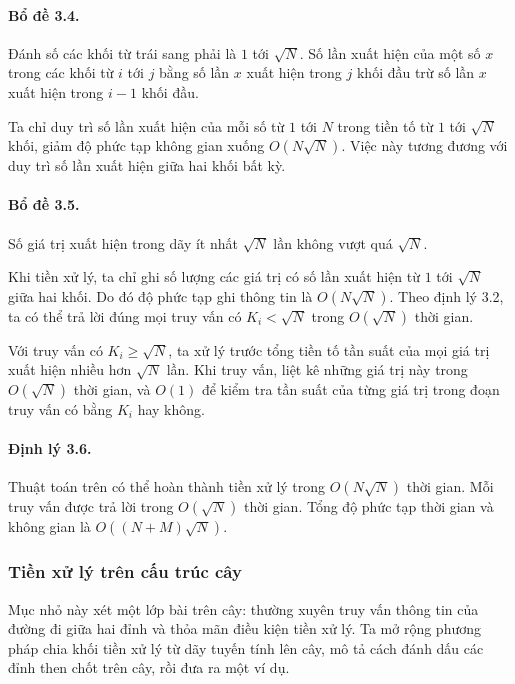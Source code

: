 \documentclass[11pt]{article}
\begin{document}
\paragraph{Bổ đề 3.4.}
Đánh số các khối từ trái sang phải là \(1\) tới \(\sqrt N\). Số lần xuất hiện
của một số \(x\) trong các khối từ \(i\) tới \(j\) bằng số lần \(x\) xuất
hiện trong \(j\) khối đầu trừ số lần \(x\) xuất hiện trong \(i-1\) khối đầu.

Ta chỉ duy trì số lần xuất hiện của mỗi số từ \(1\) tới \(N\) trong tiền tố
từ \(1\) tới \(\sqrt N\) khối, giảm độ phức tạp không gian xuống
\(O(N\sqrt N)\). Việc này tương đương với duy trì số lần xuất hiện giữa hai
khối bất kỳ.

\paragraph{Bổ đề 3.5.}
Số giá trị xuất hiện trong dãy ít nhất \(\sqrt N\) lần không vượt quá
\(\sqrt N\).

Khi tiền xử lý, ta chỉ ghi số lượng các giá trị có số lần xuất hiện từ \(1\)
tới \(\sqrt N\) giữa hai khối. Do đó độ phức tạp ghi thông tin là
\(O(N\sqrt N)\). Theo định lý 3.2, ta có thể trả lời đúng mọi truy vấn có
\(K_i<\sqrt N\) trong \(O(\sqrt N)\) thời gian.

Với truy vấn có \(K_i\ge\sqrt N\), ta xử lý trước tổng tiền tố tần suất của
mọi giá trị xuất hiện nhiều hơn \(\sqrt N\) lần. Khi truy vấn, liệt kê những
giá trị này trong \(O(\sqrt N)\) thời gian, và \(O(1)\) để kiểm tra tần suất
của từng giá trị trong đoạn truy vấn có bằng \(K_i\) hay không.

\paragraph{Định lý 3.6.}
Thuật toán trên có thể hoàn thành tiền xử lý trong \(O(N\sqrt N)\) thời gian.
Mỗi truy vấn được trả lời trong \(O(\sqrt N)\) thời gian. Tổng độ phức tạp
thời gian và không gian là \(O((N+M)\sqrt N)\).

\subsubsection{Tiền xử lý trên cấu trúc cây}

Mục nhỏ này xét một lớp bài trên cây: thường xuyên truy vấn thông tin của
đường đi giữa hai đỉnh và thỏa mãn điều kiện tiền xử lý. Ta mở rộng phương
pháp chia khối tiền xử lý từ dãy tuyến tính lên cây, mô tả cách đánh dấu các
đỉnh then chốt trên cây, rồi đưa ra một ví dụ.
\end{document}
